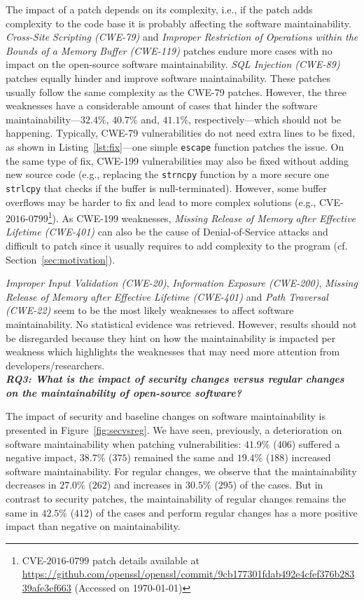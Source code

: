 \documentclass[10pt,conference]{IEEEtran}
\begin{document}
The impact of a patch depends on its complexity, i.e., if the patch
adds complexity to the code base it is probably affecting the software
maintainability. \emph{Cross-Site Scripting (CWE-79)} and 
\emph{Improper Restriction of Operations within the Bounds of 
a Memory Buffer (CWE-119)} patches endure more
cases with no impact on the open-source software maintainability. \emph{SQL Injection
(CWE-89)} patches equally hinder and improve software maintainability.
These patches usually follow the same complexity as the CWE-79 patches.
However, the three weaknesses have a considerable amount of cases that hinder
the software maintainability---$32.4\%$, $40.7\%$ and, $41.1\%$, respectively---which
should not be happening. Typically, CWE-79 vulnerabilities do not need extra lines 
to be fixed, as shown in Listing~\ref{lst:fix}---one simple 
\texttt{escape} function patches the issue. On the same type of fix,
CWE-199 vulnerabilities may also be fixed without adding new source code
(e.g., replacing the \texttt{strncpy} function by a more secure one 
\texttt{strlcpy} that checks if the buffer is null-terminated). However,
some buffer overflows may be harder to fix and lead to more complex 
solutions (e.g., 
CVE-$2016$-$0799$\footnote{CVE-$2016$-$0799$ patch details available at 
\url{https://github.com/openssl/openssl/commit/9cb177301fdab492e4cfef376b28339afe3ef663}
(Accessed on \today{})}). 
As CWE-199 weaknesses, \emph{Missing Release of Memory after Effective 
Lifetime (CWE-401)} can also be the cause of Denial-of-Service attacks and  
difficult to patch since it usually requires to add complexity to the program (cf. Section~\ref{sec:motivation}). 


\emph{Improper Input Validation (CWE-20)}, \emph{Information Exposure 
(CWE-200)}, \emph{Missing Release of Memory after Effective 
Lifetime (CWE-401)} and \emph{Path Traversal (CWE-22)} seem to be the most likely 
weaknesses to affect software maintainability. No statistical evidence was retrieved. However, results should not be disregarded because they hint on how 
the maintainability is impacted per weakness which highlights the weaknesses
that may need more attention from developers/researchers. 
%
\\\textit{\textbf{RQ3: What is the impact of security changes versus regular 
changes on the maintainability of open-source software?}}

The impact of security and baseline changes on software maintainability is presented in Figure~\ref{fig:secvsreg}.  
We have seen, previously, a deterioration on software maintainability 
when patching vulnerabilities: $41.9\%$ ($406$) suffered a 
negative impact, $38.7\%$ ($375$) remained the same and $19.4\%$ 
($188$) increased software maintainability. For regular changes, 
we observe that the maintainability decreases in $27.0\%$ ($262$) 
and increases in $30.5\%$ ($295$) of the cases. But in contrast to 
security patches, the maintainability of regular changes remains the 
same in $42.5\%$ ($412$) of the cases and perform regular
changes has a more positive impact than negative on  
maintainability. 
\end{document}
